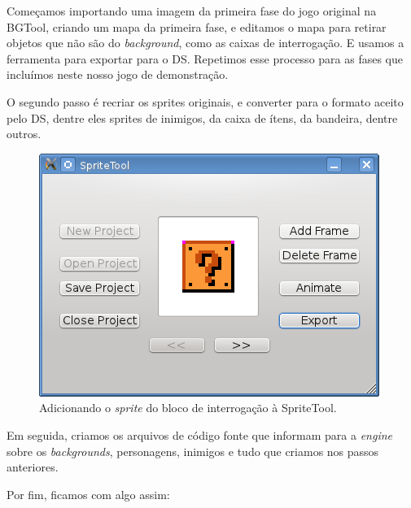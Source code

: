 \documentclass[brazil]{abnt}
\begin{document}
Começamos importando uma imagem da primeira fase do jogo original na BGTool, criando um mapa da primeira fase, e editamos o mapa para retirar objetos que não são do \textit{background}, como as caixas de interrogação. E usamos a ferramenta para exportar para o DS. Repetimos esse processo para as fases que incluímos neste nosso jogo de demonstração.

O segundo passo é recriar os sprites originais, e converter para o formato aceito pelo DS, dentre eles sprites de inimigos, da caixa de ítens, da bandeira, dentre outros.

\begin{figure}[h!]
\centering
\includegraphics{imgs/spritetool3.png}
\caption{Adicionando o \textit{sprite} do bloco de interrogação à SpriteTool.} 
\end{figure}

Em seguida, criamos os arquivos de código fonte que informam para a \textit{engine} sobre os \textit{backgrounds}, personagens, inimigos e tudo que criamos nos passos anteriores.



Por fim, ficamos com algo assim:
\end{document}
